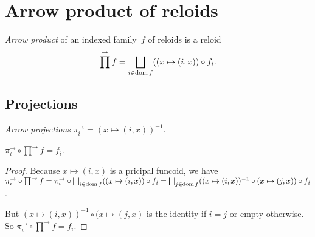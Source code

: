 \section{Arrow product of reloids}

\begin{defn}
\emph{Arrow product} of an indexed family~$f$ of reloids is
a reloid \[ \prod^{\rightarrow} f=\bigsqcup_{i\in\dom f}((x\mapsto(i,x))\circ f_i. \]
\end{defn}

\subsection{Projections}

\begin{defn}
\emph{Arrow projections}
$\pi^{\rightarrow}_i = (x\mapsto(i,x))^{-1}$.
\end{defn}

\begin{prop}
$\pi^{\rightarrow}_i\circ\prod^{\rightarrow}f=f_i$.
\end{prop}

\begin{proof}
Because $x\mapsto(i,x)$ is a pricipal funcoid, we have
$\pi^{\rightarrow}_i\circ\prod^{\rightarrow}f=
\pi^{\rightarrow}_i\circ\bigsqcup_{i\in\dom f}((x\mapsto(i,x))\circ f_i=
\bigsqcup_{j\in\dom f}((x\mapsto(i,x))^{-1}\circ(x\mapsto(j,x))\circ f_i$.

But $(x\mapsto(i,x))^{-1}\circ(x\mapsto(j,x)$ is the identity if $i=j$ or empty otherwise. So $\pi^{\rightarrow}_i\circ\prod^{\rightarrow}f=f_i$.
\end{proof}